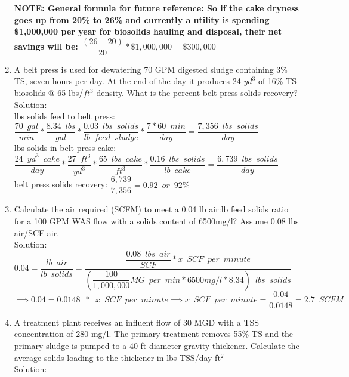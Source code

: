 \begin{enumerate}
\textbf {NOTE:  General formula for future reference: So if the cake dryness goes up from 20\% to 26\% and currently a utility is spending \$1,000,000 per year for biosolids hauling and disposal, their net savings will be: $\dfrac{(26-20)}{20}*\$1,000,000 = \$300,000$}
\\
\item A belt press is used for dewatering 70 GPM digested sludge containing 3\% TS, seven hours per day.  At the end of the day it produces 24 $yd^3$ of 16\% TS \enspace biosolids @ 65 lbs/$ft^3$ density.  What is the percent belt press solids recovery?\\
Solution:\\
lbs solids feed to belt press:  $\dfrac{70 \enspace gal}{min}*\dfrac{8.34 \enspace lbs}{gal}*
\dfrac{0.03 \enspace lbs \enspace solids}{lb \enspace feed \enspace sludge}*\dfrac{7*60 \enspace min}{day}=\dfrac{7,356 \enspace lbs \enspace solids}{day}$\\
\vspace{0.25cm}
lbs solids in belt press cake: $\dfrac{24 \enspace yd^3 \enspace cake}{day}*\dfrac{27 \enspace ft^3}{yd^3}*\dfrac{65 \enspace lbs \enspace cake}{ft^3}*\dfrac{0.16 \enspace lbs \enspace solids}{lb \enspace cake}=\dfrac{6,739 \enspace lbs \enspace solids}{day}$\\
\vspace{0.25cm}
belt press solids recovery: $\dfrac{6,739}{7,356}=\boxed{0.92 \enspace or \enspace 92\%}$


\item Calculate the air required (SCFM) to meet a 0.04 lb air:lb feed solids ratio for a 100 GPM WAS flow with a solids content of 6500mg/l? Assume 0.08 lbs air/SCF air.\\
Solution:\\
$0.04=\dfrac{lb \enspace air}{lb \enspace solids}=\dfrac{\dfrac{0.08 \enspace lbs  \enspace air}{SCF}*x \enspace SCF \enspace per \enspace  minute}{(\dfrac{100}{1,000,000}MG \enspace per \enspace min*6500mg/l*8.34) \enspace lbs  \enspace solids}$\\
\vspace{0.25cm}
$\implies0.04=0.0148 \enspace *\enspace x \enspace SCF \enspace per \enspace  minute \implies x \enspace SCF \enspace per \enspace  minute =\dfrac{0.04}{0.0148}=\boxed{2.7 \enspace SCFM}$

\item A treatment plant receives an influent flow of 30 MGD with a TSS concentration of 280 mg/l.  The primary treatment removes 55\% TS and the primary sludge is pumped to a 40 ft diameter gravity thickener.  Calculate the average solids loading to the thickener in lbs TSS/day-ft$^2$\\
Solution:\\
 

\end{enumerate}

